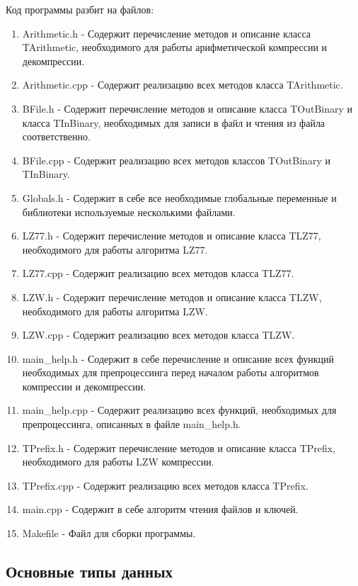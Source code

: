 \documentclass[12pt]{article}
\begin{document}
Код программы разбит на %
 файлов:

\begin{enumerate}
	\item Arithmetic.h - Содержит перечисление методов и описание класса TArithmetic, необходимого для работы арифметической компрессии и декомпрессии. 
	\item Arithmetic.cpp - Содержит реализацию всех методов класса TArithmetic.
	\item BFile.h - Содержит перечисление методов и описание класса TOutBinary и класса TInBinary, необходимых для записи в файл и чтения из файла соответственно.
	\item BFile.cpp - Содержит реализацию всех методов классов TOutBinary и TInBinary.
	\item Globals.h - Содержит в себе все необходимые глобальные переменные и библиотеки используемые несколькими файлами.
	\item LZ77.h - Содержит перечисление методов и описание класса TLZ77, необходимого для работы алгоритма LZ77.
	\item LZ77.cpp - Содержит реализацию всех методов класса TLZ77.
	\item LZW.h - Содержит перечисление методов и описание класса TLZW, необходимого для работы алгоритма LZW.
	\item LZW.cpp - Содержит реализацию всех методов класса TLZW.
	\item main\_help.h - Содержит в себе перечисление и описание всех функций необходимых для препроцессинга перед началом работы алгоритмов компрессии и декомпрессии.
	\item main\_help.cpp - Содержит реализацию всех функций, необходимых для препроцессинга, описанных в файле main\_help.h.
	\item TPrefix.h - Содержит перечисление методов и описание класса TPrefix, необходимого для работы LZW компрессии.
	\item TPrefix.cpp - Содержит реализацию всех методов класса TPrefix.
	\item main.cpp - Содержит в себе алгоритм чтения файлов и ключей.
	\item Makefile - Файл для сборки программы.
\end{enumerate}

\subsection*{Основные типы данных}
\end{document}
